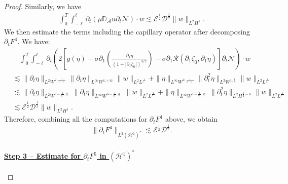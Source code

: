\documentclass[letterpaper,reqno,10pt,twoside]{amsart}
\theoremstyle{definition}
\theoremstyle{remark}
\def\p{\partial}
\begin{document}
\begin{proof}
			\noindent Similarly, we have
			\[
			\begin{aligned}
				\int_{0}^{T}\int_{-\ell}^{\ell}\p_{t}(\mu \mathbb{D}_{\mathcal{A}}u\p_{t}\mathcal{N})\cdot w
				\lesssim\mathscr{E}^{\frac{1}{2}}\mathscr{D}^{\frac{1}{2}}\|w\|_{L^{2}H^{1}}.
			\end{aligned}
			\]
			We then estimate the terms including the capillary operator after decomposing $\p_{t}F^{4}$. We have:
			\[
			\begin{aligned}
				&\quad \int_{0}^{T}\int_{-\ell}^{\ell} \p_{t}(2\left[g(\eta)-\sigma\p_1\left(\frac{\p_1\eta}{(1+|\p_1\zeta_0|)^{3/2}}\right)-\sigma\partial_{1}\mathcal{R}(\partial_{1}\zeta_{0},\partial_{1}\eta)\right]\p_t\mathcal{N})\cdot w\\
				&\lesssim \|\p_{t}\eta\|_{L^{2}W^{2,\frac{1}{1-\varepsilon_{-}}}}\|\p_{t}\eta\|_{L^{\infty}W^{1,+\infty}}\|w\|_{L^{2}L^{\frac{1}{\varepsilon_{-}}}}+\|\eta\|_{L^{\infty}W^{2,\frac{1}{1-\varepsilon_{-}}}}\|\p_{t}^{2}\eta\|_{L^{2}W^{1,\frac{1}{\alpha}}}\|w\|_{L^{2}L^{\frac{1}{\varepsilon_{-}}}}\\
				&\lesssim \|\p_{t}\eta\|_{L^{2}W^{3-\frac{1}{q_{-}},q_{-}}}\|\p_{t}\eta\|_{L^{\infty}W^{3-\frac{1}{q_{-}},q_{-}}}\|w\|_{L^{2}L^{\frac{1}{\varepsilon_{-}}}}+\|\eta\|_{L^{\infty}W^{3-\frac{1}{q_{-}},q_{-}}}\|\p_{t}^{2}\eta\|_{L^{2}H^{\frac{3}{2}-\alpha}}\|w\|_{L^{2}L^{\frac{1}{\varepsilon_{-}}}}\\
				&\lesssim \mathscr{E}^{\frac{1}{2}}\mathscr{D}^{\frac{1}{2}}\|w\|_{L^{2}H^{1}}.
			\end{aligned}
			\]
			\noindent Therefore, combining all the computations for $\p_{t}F^{4}$ above, we obtain
			\[
			\|\partial_{t}F^{4}\|_{L^{2}(\mathcal{H}^1)^{*}}\lesssim \mathscr{E}^{\frac{1}{2}}\mathscr{D}^{\frac{1}{2}}.
			\]
			
			\paragraph{\underline{Step 3 -- Estimate for $\partial_{t}F^{5}$ in $(\mathcal{H}^1)^{*}$}} 
			

\end{proof}
\end{document}
